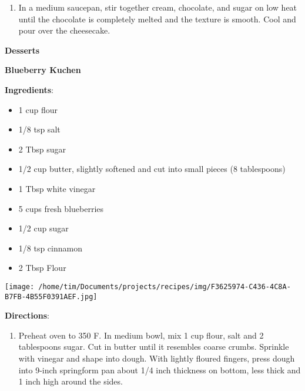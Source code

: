 \documentclass[11pt, twoside, openany]{book}
\begin{document}
\begin{minipage}[t]{\linewidth}
\begin{enumerate}
\item In a medium saucepan, stir together cream, chocolate, and sugar on low heat until the chocolate is completely melted and the texture is smooth. Cool and pour over the cheesecake.
\end{enumerate}
\end{minipage}\vspace{8mm}

{\newpage \LARGE \textbf{Desserts}} \label{desserts}\\
\noindent\begin{minipage}[t]{\linewidth}%
{\Large\textbf{Blueberry Kuchen}} \label{blueberry-kuchen}\hfill\textit{}\\
\noindent\begin{minipage}[t]{0.78\linewidth}%
\textbf{Ingredients}:\vspace{-3mm}
\begin{multicols}{2}
\begin{itemize}\setlength\itemsep{-1mm}
\item 1 cup flour
\item 1/8 tsp salt
\item 2 Tbsp sugar
\item 1/2 cup butter, slightly softened and cut into small pieces (8 tablespoons)
\item 1 Tbsp white vinegar
\item 5 cups fresh blueberries
\item 1/2 cup sugar
\item 1/8 tsp cinnamon
\item 2 Tbsp Flour
\end{itemize}
\end{multicols}
\end{minipage}
\noindent\begin{minipage}[t]{0.18\linewidth}
\centering \strut\vspace*{-\baselineskip}\newline
\texttt{[image: /home/tim/Documents/projects/recipes/img/F3625974-C436-4C8A-B7FB-4B55F0391AEF.jpg]}\\
\end{minipage}\vspace{3mm}
\textbf{Directions}:
\vspace{-3mm}\begin{enumerate}\setlength\itemsep{-1mm}
\item Preheat oven to 350 F. In medium bowl, mix 1 cup flour, salt and 2 tablespoons sugar. Cut in butter until it resembles coarse crumbs. Sprinkle with vinegar and shape into dough. With lightly floured fingers, press dough into 9-inch springform pan about 1/4 inch thickness on bottom, less thick and 1 inch high around the sides.

\end{enumerate}
\end{minipage}
\end{document}
